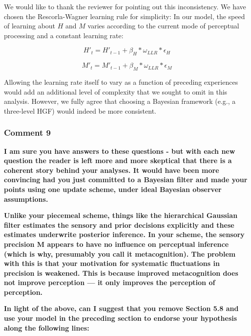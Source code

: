 \documentclass[
]{article}
\begin{document}
We would like to thank the reviewer for pointing out this inconsistency.
We have chosen the Rescorla-Wagner learning rule for simplicity: In our
model, the speed of learning about \(H\) and \(M\) varies according to
the current mode of perceptual processing and a constant learning rate:

\begin{equation}
H'_t = H'_{t-1} + \beta_H *\omega_{LLR} * \epsilon_H
\end{equation}

\begin{equation}
M'_t = M'_{t-1} + \beta_M *\omega_{LLR} * \epsilon_M
\end{equation}

Allowing the learning rate itself to vary as a function of preceding
experiences would add an additional level of complexity that we sought
to omit in this analysis. However, we fully agree that choosing a
Bayesian framework (e.g., a three-level HGF) would indeed be more
consistent.

\hypertarget{comment-9}{%
\subsubsection{Comment 9}\label{comment-9}}

\textbf{I am sure you have answers to these questions - but with each
new question the reader is left more and more skeptical that there is a
coherent story behind your analyses. It would have been more convincing
had you just committed to a Bayesian filter and made your points using
one update scheme, under ideal Bayesian observer assumptions.}

\textbf{Unlike your piecemeal scheme, things like the hierarchical
Gaussian filter estimates the sensory and prior decisions explicitly and
these estimates underwrite posterior inference. In your scheme, the
sensory precision M appears to have no influence on perceptual inference
(which is why, presumably you call it metacognition). The problem with
this is that your motivation for systematic fluctuations in precision is
weakened. This is because improved metacognition does not improve
perception --- it only improves the perception of perception.}

\textbf{In light of the above, can I suggest that you remove Section 5.8
and use your model in the preceding section to endorse your hypothesis
along the following lines:}
\end{document}
